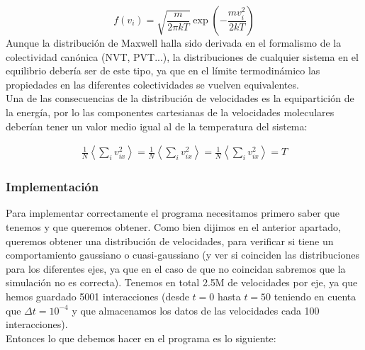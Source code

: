 \documentclass[11pt]{article} %
\newcommand{\parentesis}[1]{\left( #1  \right)}
\begin{document}
\begin{equation}
	f(v_i) = \sqrt{\frac{m}{2\pi k T}} \exp \parentesis{- \frac{mv_i^2}{2kT}}
\end{equation}
Aunque la distribución de Maxwell halla sido derivada en el formalismo de la colectividad canónica (NVT, PVT...), la distribuciones de cualquier sistema en el equilibrio debería ser de este tipo, ya que en el límite termodinámico las propiedades en las diferentes colectividades se vuelven equivalentes. \\

Una de las consecuencias de la distribución de velocidades es la equipartición de la energía, por lo las componentes cartesianas de la velocidades moleculares deberían tener un valor medio igual al de la temperatura del sistema:

\begin{eqnarray}
	\frac{1}{N} \left\langle \sum_i v_{ix}^2 \right\rangle = 
	\frac{1}{N} \left\langle \sum_i v_{ix}^2 \right\rangle = 
	\frac{1}{N} \left\langle \sum_i v_{ix}^2 \right\rangle = T
\end{eqnarray}

\subsubsection{Implementación}

Para implementar correctamente el programa necesitamos primero saber que tenemos y que queremos obtener. Como bien dijimos en el anterior apartado, queremos obtener una distribución de velocidades, para verificar si tiene un comportamiento gaussiano o cuasi-gaussiano (y ver si coinciden las distribuciones para los diferentes ejes, ya que en el caso de que no coincidan sabremos que la simulación no es correcta). Tenemos en total 2.5M de velocidades por eje, ya que hemos guardado 5001 interacciones (desde $t=0$ hasta $t=50$ teniendo en cuenta que $\Delta t= 10^{-4}$ y que almacenamos los datos de las velocidades cada 100 interacciones). \\

Entonces lo que debemos hacer en el programa es lo siguiente:
\end{document}
